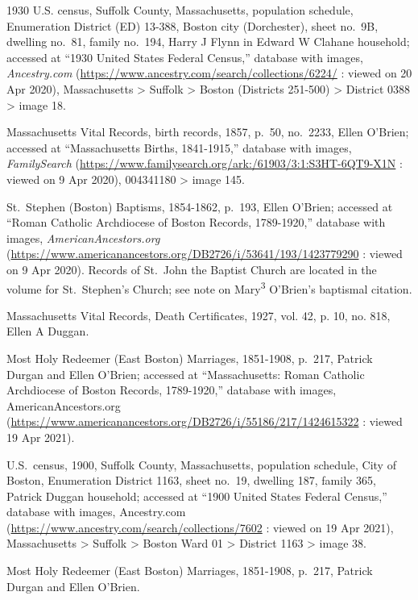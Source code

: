 \begin{thebibliography}{999}
1930 U.S. census, Suffolk County, Massachusetts, population schedule, Enumeration District (ED) 13-388, Boston city (Dorchester), sheet no.\ 9B, dwelling no.\ 81, family no.\ 194, Harry J Flynn in Edward W Clahane household; accessed at ``1930 United States Federal Census,'' database with images, \textit{Ancestry.com} (\url{https://www.ancestry.com/search/collections/6224/} : viewed on 20 Apr 2020), Massachusetts > Suffolk > Boston (Districts 251-500) > District 0388 > image 18.


Massachusetts Vital Records, birth records, 1857, p.\ 50, no.\ 2233, Ellen O'Brien; accessed at ``Massachusetts Births, 1841-1915,'' database with images, \textit{FamilySearch} (\url{https://www.familysearch.org/ark:/61903/3:1:S3HT-6QT9-X1N} : viewed on 9 Apr 2020), 004341180 > image 145.

St.\ Stephen (Boston) Baptisms, 1854-1862, p.\ 193, Ellen O'Brien; accessed at ``Roman Catholic Archdiocese of Boston Records, 1789-1920,'' database with images, \textit{AmericanAncestors.org} (\url{https://www.americanancestors.org/DB2726/i/53641/193/1423779290} : viewed on 9 Apr 2020). Records of St.\ John the Baptist Church are located in the volume for St.\ Stephen's Church; see note on Mary\textsuperscript{3} O'Brien's baptismal citation.

Massachusetts Vital Records, Death Certificates, 1927, vol. 42, p. 10, no. 818, Ellen A Duggan.

Most Holy Redeemer (East Boston) Marriages, 1851-1908, p.\ 217, Patrick Durgan and Ellen O'Brien; accessed at ``Massachusetts: Roman Catholic Archdiocese of Boston Records, 1789-1920,'' database with images, AmericanAncestors.org (\url{https://www.americanancestors.org/DB2726/i/55186/217/1424615322} : viewed 19 Apr 2021).

U.S.\ census, 1900, Suffolk County, Massachusetts, population schedule, City of Boston, Enumeration District 1163, sheet no.\ 19, dwelling 187, family 365, Patrick Duggan household; accessed at ``1900 United States Federal Census,'' database with images, Ancestry.com (\url{https://www.ancestry.com/search/collections/7602} : viewed on 19 Apr 2021), Massachusetts > Suffolk > Boston Ward 01 > District 1163 > image 38.

Most Holy Redeemer (East Boston) Marriages, 1851-1908, p.\ 217, Patrick Durgan and Ellen O'Brien.


\end{thebibliography}
